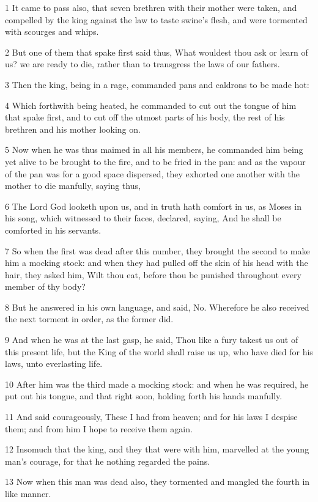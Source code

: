 \par 1 It came to pass also, that seven brethren with their mother were taken, and compelled by the king against the law to taste swine's flesh, and were tormented with scourges and whips.
\par 2 But one of them that spake first said thus, What wouldest thou ask or learn of us? we are ready to die, rather than to transgress the laws of our fathers.
\par 3 Then the king, being in a rage, commanded pans and caldrons to be made hot:
\par 4 Which forthwith being heated, he commanded to cut out the tongue of him that spake first, and to cut off the utmost parts of his body, the rest of his brethren and his mother looking on.
\par 5 Now when he was thus maimed in all his members, he commanded him being yet alive to be brought to the fire, and to be fried in the pan: and as the vapour of the pan was for a good space dispersed, they exhorted one another with the mother to die manfully, saying thus,
\par 6 The Lord God looketh upon us, and in truth hath comfort in us, as Moses in his song, which witnessed to their faces, declared, saying, And he shall be comforted in his servants.
\par 7 So when the first was dead after this number, they brought the second to make him a mocking stock: and when they had pulled off the skin of his head with the hair, they asked him, Wilt thou eat, before thou be punished throughout every member of thy body?
\par 8 But he answered in his own language, and said, No. Wherefore he also received the next torment in order, as the former did.
\par 9 And when he was at the last gasp, he said, Thou like a fury takest us out of this present life, but the King of the world shall raise us up, who have died for his laws, unto everlasting life.
\par 10 After him was the third made a mocking stock: and when he was required, he put out his tongue, and that right soon, holding forth his hands manfully.
\par 11 And said courageously, These I had from heaven; and for his laws I despise them; and from him I hope to receive them again.
\par 12 Insomuch that the king, and they that were with him, marvelled at the young man's courage, for that he nothing regarded the pains.
\par 13 Now when this man was dead also, they tormented and mangled the fourth in like manner.
